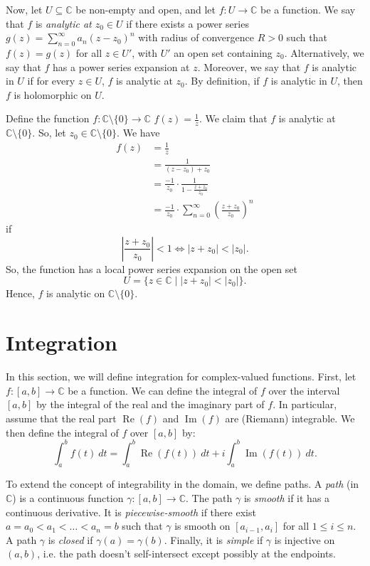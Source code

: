 \documentclass[a4paper, openany]{memoir}
\theoremstyle{definition}
\theoremstyle{plain}
\begin{document}
    Now, let $U \subseteq \mathbb{C}$ be non-empty and open, and let $f \colon U \to \mathbb{C}$ be a function. We say that $f$ is \emph{analytic at $z_0 \in U$} if there exists a power series $g(z) = \sum_{n=0}^\infty a_n (z - z_0)^n$ with radius of convergence $R > 0$ such that $f(z) = g(z)$ for all $z \in U'$, with $U'$ an open set containing $z_0$. Alternatively, we say that $f$ has a power series expansion at $z$. Moreover, we say that $f$ is analytic in $U$ if for every $z \in U$, $f$ is analytic at $z_0$. By definition, if $f$ is analytic in $U$, then $f$ is holomorphic on $U$.

    Define the function $f \colon \mathbb{C} \setminus \{0\} \to \mathbb{C}$ $f(z) = \frac{1}{z}$. We claim that $f$ is analytic at $\mathbb{C} \setminus \{0\}$. So, let $z_0 \in \mathbb{C} \setminus \{0\}$. We have
    \begin{align*}
        f(z) &= \frac{1}{z} \\
        &= \frac{1}{(z - z_0) + z_0} \\
        &= \frac{-1}{z_0} \cdot \frac{1}{1 - \frac{z + z_0}{z_0}} \\
        &= \frac{-1}{z_0} \cdot \sum_{n=0}^\infty \left(\frac{z + z_0}{z_0} \right)^n 
    \end{align*}
    if 
    \[\left|\frac{z + z_0}{z_0}\right| < 1 \iff |z + z_0| < |z_0|.\]
    So, the function has a local power series expansion on the open set
    \[U = \{z \in \mathbb{C} \mid |z + z_0| < |z_0|\}.\]
    Hence, $f$ is analytic on $\mathbb{C} \setminus \{0\}$.
    \newpage

    \section{Integration}
    In this section, we will define integration for complex-valued functions. First, let $f \colon [a, b] \to \mathbb{C}$ be a function. We can define the integral of $f$ over the interval $[a, b]$ by the integral of the real and the imaginary part of $f$. In particular, assume that the real part $\operatorname{Re} (f)$ and $\operatorname{Im} (f)$ are (Riemann) integrable. We then define the integral of $f$ over $[a, b]$ by:
    \[\int_a^b f(t) \ dt = \int_a^b \operatorname{Re}(f(t)) \ dt + i \int_a^b \operatorname{Im}(f(t)) \ dt.\]

    To extend the concept of integrability in the domain, we define paths. A \emph{path} (in $\mathbb{C}$) is a continuous function $\gamma \colon [a, b] \to \mathbb{C}$. The path $\gamma$ is \emph{smooth} if it has a continuous derivative. It is \emph{piecewise-smooth} if there exist $a = a_0 < a_1 < \dots < a_n = b$ such that $\gamma$ is smooth on $[a_{i-1}, a_i]$ for all $1 \leq i \leq n$. A path $\gamma$ is \emph{closed} if $\gamma(a) = \gamma(b)$. Finally, it is \emph{simple} if $\gamma$ is injective on $(a, b)$, i.e. the path doesn't self-intersect except possibly at the endpoints.
    
\end{document}
